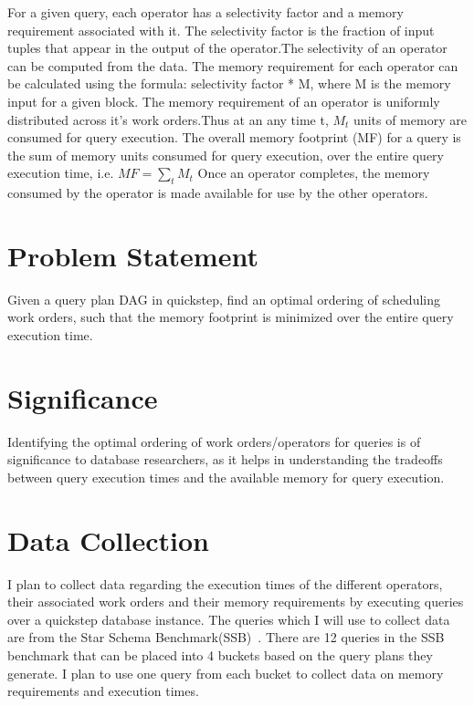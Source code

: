 \documentclass[20pt]{sigchi}
\begin{document}
For a given query, each operator has a selectivity factor and a memory requirement associated with it. The selectivity factor is the fraction of input tuples that appear in the output of the operator.The selectivity of an operator can be computed from the data. 
The memory requirement for each operator can be calculated using the formula:  selectivity factor * M, where M is the memory input for a given block. 
The memory requirement of an operator is uniformly distributed across it's work orders.Thus at an any time t, $M_{t}$ units of memory are consumed for query execution. 
The overall memory footprint (MF)  for a query is the sum of  memory units consumed for query execution, over the entire query execution time, i.e. $MF = \sum \limits_{t} M_{t}$
Once an operator completes, the memory consumed by the operator is made available for use by the other operators. 

\section{Problem Statement}
Given a query plan DAG in quickstep, find an optimal ordering of  scheduling work orders, such that the memory footprint is minimized over the entire query execution time.
\section{Significance}
Identifying the optimal ordering of work orders/operators  for queries is of significance to database researchers, as it helps  in understanding the tradeoffs between query execution times 
and the available memory for query execution.

\section{Data Collection}
I plan to collect data regarding the execution times of the different operators, their associated work orders  and their memory requirements by executing queries over a quickstep database instance. 
The queries which I will use to collect data  are from the Star Schema Benchmark(SSB)~\cite{o2007star}.  There are  12 queries in the SSB benchmark that can be placed into 4 buckets based on the query plans they generate. I plan to use one query from each bucket to collect data on memory requirements and execution times.
\end{document}
